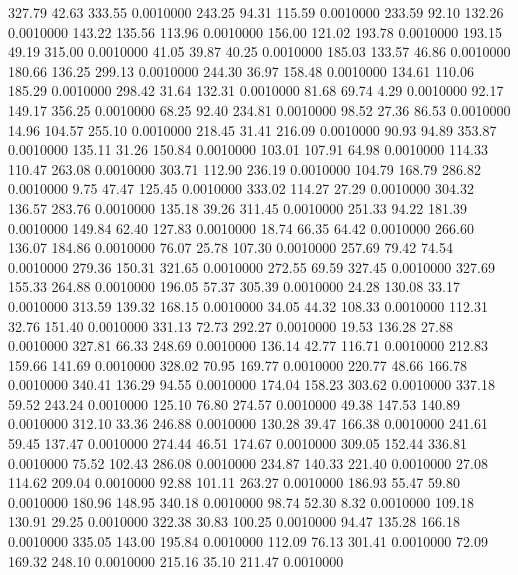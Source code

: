  327.79   42.63  333.55   0.0010000
 243.25   94.31  115.59   0.0010000
 233.59   92.10  132.26   0.0010000
 143.22  135.56  113.96   0.0010000
 156.00  121.02  193.78   0.0010000
 193.15   49.19  315.00   0.0010000
  41.05   39.87   40.25   0.0010000
 185.03  133.57   46.86   0.0010000
 180.66  136.25  299.13   0.0010000
 244.30   36.97  158.48   0.0010000
 134.61  110.06  185.29   0.0010000
 298.42   31.64  132.31   0.0010000
  81.68   69.74    4.29   0.0010000
  92.17  149.17  356.25   0.0010000
  68.25   92.40  234.81   0.0010000
  98.52   27.36   86.53   0.0010000
  14.96  104.57  255.10   0.0010000
 218.45   31.41  216.09   0.0010000
  90.93   94.89  353.87   0.0010000
 135.11   31.26  150.84   0.0010000
 103.01  107.91   64.98   0.0010000
 114.33  110.47  263.08   0.0010000
 303.71  112.90  236.19   0.0010000
 104.79  168.79  286.82   0.0010000
   9.75   47.47  125.45   0.0010000
 333.02  114.27   27.29   0.0010000
 304.32  136.57  283.76   0.0010000
 135.18   39.26  311.45   0.0010000
 251.33   94.22  181.39   0.0010000
 149.84   62.40  127.83   0.0010000
  18.74   66.35   64.42   0.0010000
 266.60  136.07  184.86   0.0010000
  76.07   25.78  107.30   0.0010000
 257.69   79.42   74.54   0.0010000
 279.36  150.31  321.65   0.0010000
 272.55   69.59  327.45   0.0010000
 327.69  155.33  264.88   0.0010000
 196.05   57.37  305.39   0.0010000
  24.28  130.08   33.17   0.0010000
 313.59  139.32  168.15   0.0010000
  34.05   44.32  108.33   0.0010000
 112.31   32.76  151.40   0.0010000
 331.13   72.73  292.27   0.0010000
  19.53  136.28   27.88   0.0010000
 327.81   66.33  248.69   0.0010000
 136.14   42.77  116.71   0.0010000
 212.83  159.66  141.69   0.0010000
 328.02   70.95  169.77   0.0010000
 220.77   48.66  166.78   0.0010000
 340.41  136.29   94.55   0.0010000
 174.04  158.23  303.62   0.0010000
 337.18   59.52  243.24   0.0010000
 125.10   76.80  274.57   0.0010000
  49.38  147.53  140.89   0.0010000
 312.10   33.36  246.88   0.0010000
 130.28   39.47  166.38   0.0010000
 241.61   59.45  137.47   0.0010000
 274.44   46.51  174.67   0.0010000
 309.05  152.44  336.81   0.0010000
  75.52  102.43  286.08   0.0010000
 234.87  140.33  221.40   0.0010000
  27.08  114.62  209.04   0.0010000
  92.88  101.11  263.27   0.0010000
 186.93   55.47   59.80   0.0010000
 180.96  148.95  340.18   0.0010000
  98.74   52.30    8.32   0.0010000
 109.18  130.91   29.25   0.0010000
 322.38   30.83  100.25   0.0010000
  94.47  135.28  166.18   0.0010000
 335.05  143.00  195.84   0.0010000
 112.09   76.13  301.41   0.0010000
  72.09  169.32  248.10   0.0010000
 215.16   35.10  211.47   0.0010000
